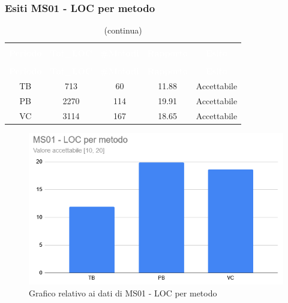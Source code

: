 \subsubsection{Esiti MS01 - LOC per metodo}
\begin{longtable}{c c c c c}
\rowcolor{white}\caption{Esiti MS01 - LOC per metodo} \\
	\rowcolor{redafk}
	\textcolor{white}{\textbf{Periodo}} &
	\textcolor{white}{\textbf{Tot\_LOC}} &
	\textcolor{white}{\textbf{\#Metodi}} &
\textcolor{white}{\textbf{Rapporto}} &
\textcolor{white}{\textbf{Esito}} \\
	\endfirsthead
		\rowcolor{white}\caption[]{(continua)} \\
		\rowcolor{redafk}
	\textcolor{white}{\textbf{Periodo}} &
	\textcolor{white}{\textbf{Tot\_LOC}} &
	\textcolor{white}{\textbf{\#Metodi}} &
\textcolor{white}{\textbf{Rapporto}} &
\textcolor{white}{\textbf{Esito}} \\
	\endhead
	TB & 713 & 60 & 11.88 & Accettabile\\	
	PB & 2270 & 114 & 19.91 & Accettabile \\
	VC & 3114 & 167 & 18.65 & Accettabile \\
\end{longtable}

\begin{figure}[H]
\centering
\includegraphics[scale=0.7]{./img/MS01.png}
\caption{Grafico relativo ai dati di MS01 - LOC per metodo}
\end{figure}
\pagebreak
